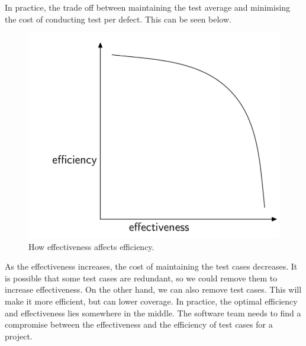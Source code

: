 \documentclass[a4paper, openany]{memoir}
\begin{document}
In practice, the trade off between maintaining the test average and minimising the cost of conducting test per defect. This can be seen below.
\begin{figure}[H]
    \centering
    \includegraphics[scale=0.5]{src/12 Effectiveness v Efficiency.PNG}
    \caption{How effectiveness affects efficiency.}
\end{figure}
\noindent As the effectiveness increases, the cost of maintaining the test cases decreases. It is possible that some test cases are redundant, so we could remove them to increase effectiveness. On the other hand, we can also remove test cases. This will make it more efficient, but can lower coverage. In practice, the optimal efficiency and effectiveness lies somewhere in the middle. The software team needs to find a compromise between the effectiveness and the efficiency of test cases for a project.
\end{document}
